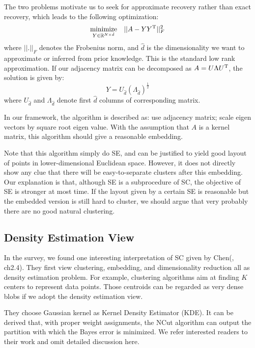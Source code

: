 The two problems motivate us to seek for approximate recovery 
rather than exact recovery, which leads to the following optimization:
\begin{eqnarray}
	\operatorname*{minimize}_{Y \in \mathbb{R}^{N \times \hat{d}}} 
	&& ||A - Y Y^\mathrm{T}||_F^2
	\label{eq:lrapprox_opt}
\end{eqnarray}
where $ ||.||_F $ denotes the Frobenius norm\cite{wiki_mnorm}, 
and $ \hat{d} $ is the dimensionality we want to approximate or 
inferred from prior knowledge. This is the standard low rank 
approximation. If our adjacency matrix can be decomposed as 
$ A = U \Lambda U^\mathrm{T} $, the solution is given by:
\begin{equation}
	Y = U_{\hat{d}} (\Lambda_{\hat{d}})^{\frac{1}{2}}
	\label{eq:lrapprox}
\end{equation}
where $ U_{\hat{d}}$ and $\Lambda_{\hat{d}} $ denote first 
$ \hat{d} $ columns of corresponding matrix. 

In our framework, the algorithm is described as:
use adjacency matrix; scale eigen vectors by square root eigen value. 
With the assumption that $ A $ is a kernel matrix, this algorithm 
should give a reasonable embedding. 

Note that this algorithm simply do SE, and can be justified to 
yield good layout of points in lower-dimensional Euclidean space. 
However, it does not directly show any clue that there will 
be easy-to-separate clusters after this embedding. Our explanation 
is that, although SE is a subprocedure of SC, the objective of SE 
is stronger at most time. If the layout given by a certain SE 
is reasonable but the embedded version is still hard to cluster, we should 
argue that very probably there are no good natural clustering. 

\subsection{Density Estimation View}
In the survey, we found one interesting interpretation of SC given 
by Chen(\cite{chen2010isoperimetric}, ch2.4). They first view 
clustering, embedding, and dimensionality reduction all as 
density estimation problem. For example, clustering algorithms 
aim at finding $ K $ centers to represent data points. Those 
centroids can be regarded as very dense blobs if we adopt the 
density estimation view. 

They choose Gaussian kernel as Kernel Density Estimator (KDE). 
It can be derived that, with proper weight assignments, the NCut 
algorithm can output the partition with which the Bayes error 
is minimized. We refer interested readers to their work and 
omit detailed discussion here. 

